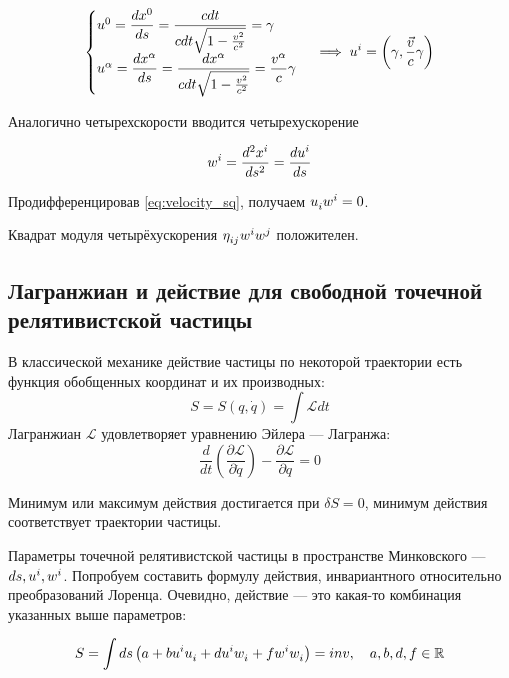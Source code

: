\documentclass{article}
\begin{document}
\begin{equation*}
    \begin{cases}
    \tensor{u}{^0}=\dfrac{d\tensor{x}{^0}}{ds}=\dfrac{cdt}{cdt\sqrt{1-\frac{v^2}{c^2}}}=\gamma\\
    \tensor{u}{^\alpha}=\dfrac{d\tensor{x}{^\alpha}}{ds}=\dfrac{d\tensor{x}{^\alpha}}{cdt\sqrt{1-\frac{v^2}{c^2}}}=\dfrac{\tensor{v}{^\alpha}}{c}\gamma
    \end{cases}\implies\tensor{u}{^i}=\left(\gamma,\dfrac{\vec{v}}{c}\gamma\right)
\end{equation*}

Аналогично четырехскорости вводится четырехускорение

\begin{equation*}
    \tensor{w}{^i}=\dfrac{d^2\tensor{x}{^i}}{ds^2}=\dfrac{d\tensor{u}{^i}}{ds}
\end{equation*}

Продифференцировав \eqref{eq:velocity_sq}, получаем $\tensor{u}{_i}\tensor{w}{^i}=0$.

Квадрат модуля четырёхускорения $\tensor{\eta}{_i_j}\tensor{w}{^i}\tensor{w}{^j}$ положителен.

\subsection{Лагранжиан и действие для свободной точечной релятивистской частицы}

В классической механике действие частицы по некоторой траектории есть функция обобщенных координат и их производных:
\begin{equation*}
    S=S\left(q,\dot{q}\right)=\int\mathscr{L}dt
\end{equation*}
Лагранжиан $\mathscr{L}$ удовлетворяет уравнению Эйлера --- Лагранжа:
\begin{equation}\label{eq:euler}
    \dfrac{d}{dt}\left(\dfrac{\partial\mathscr{L}}{\partial\dot{q}}\right)-\dfrac{\partial\mathscr{L}}{\partial q}=0
\end{equation}

Минимум или максимум действия достигается при $\delta S=0$, минимум действия соответствует траектории частицы.

Параметры точечной релятивистской частицы в пространстве Минковского --- $ds,\tensor{u}{^i},\tensor{w}{^i}$. Попробуем составить формулу действия, инвариантного относительно преобразований Лоренца. Очевидно, действие --- это какая-то комбинация указанных выше параметров:

\begin{equation}\label{S_before}
    S=\int ds\left(a+b\tensor{u}{^i}\tensor{u}{_i}+d\tensor{u}{^i}\tensor{w}{_i}+f\tensor{w}{^i}\tensor{w}{_i}\right)=inv,\quad a,b,d,f\in\mathbb{R}
\end{equation}
\end{document}
